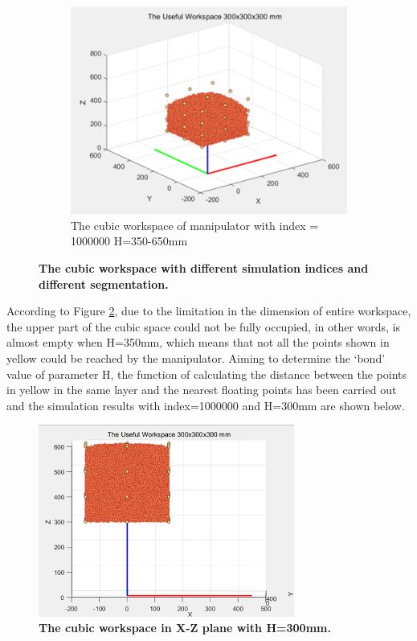 \begin{figure}[H]
\begin{subfigure}{0.45\textwidth}
        \includegraphics[width=\linewidth]{Image/Result/rect_workspace_1000000_350-650.png}
        \caption{\centering The cubic workspace of manipulator with index = 1000000 H=350-650mm}
        \label{fig:ws_1000000_350}
    \end{subfigure}
    \caption[The entire workspace with different random indices]
    {\centering \textbf{The cubic workspace with different simulation indices and different segmentation.}}
    \label{fig:ws_diff_segmentation}
\end{figure}
\noindent According to Figure \ref{fig:ws_diff_segmentation}, due to the limitation in the dimension of entire workspace, 
the upper part of the cubic space could not be fully occupied, in other words, is almost empty when H=350mm, which 
means that not all the points shown in yellow could be reached by the manipulator. Aiming to determine the ‘bond’ 
value of parameter H, the function of calculating the distance between the points in yellow in the same layer and 
the nearest floating points has been carried out and the simulation results with index=1000000 and H=300mm are 
shown below.
\begin{figure}[H] %
    \centering %
    \captionsetup{labelsep=colon}
    \includegraphics[width=0.75\textwidth]{Image/Result/rect_workspace_1000000_300-600.png} 
    \caption[The cubic workspace in X-Z plane with H=300mm]
    {\centering \textbf{The cubic workspace in X-Z plane with H=300mm.}}
    \label{fig:cub_ws_300_600}
\end{figure}
